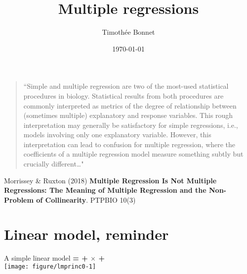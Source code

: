 \documentclass[10pt]{beamer}\usepackage[]{graphicx}\usepackage[]{color}
\title{Multiple regressions}
\author{Timoth\'ee Bonnet}
\institute{BDSI / RSB}
\date{\today}
\newenvironment{knitrout}{}{} %
\begin{document}
\begin{frame}
  \begin{quote}
  ``Simple and multiple regression are two of the most-used statistical procedures in biology. Statistical results from both procedures are commonly interpreted as metrics of the degree of relationship between (sometimes multiple) explanatory and response variables. This rough interpretation may generally be satisfactory for simple regressions, i.e., models involving only one explanatory variable. However, this interpretation can lead to confusion for multiple regression, where the coefficients of a multiple regression model measure something subtly but crucially different\dots"
  \end{quote}
Morrissey \& Ruxton (2018) \textbf{Multiple Regression Is Not Multiple Regressions: The Meaning of Multiple Regression and the Non-Problem of Collinearity}. PTPBIO 10(3)

\end{frame}

\begin{frame}
\maketitle
\end{frame}





\section{Linear model, reminder}

\begin{frame}[fragile]{A simple linear model}
  \textbf{{\color{purple}{Response}} = {\color{blue}{Intercept}} + {\color{red}{Slope}} $\times$ {\color{orange}{Predictor}} + {\color{gray}{Error}}} \\

\begin{knitrout}\small
{}\color{fgcolor}
\texttt{[image: figure/lmprinc0-1]} 

\end{knitrout}
\end{frame}
\end{document}
